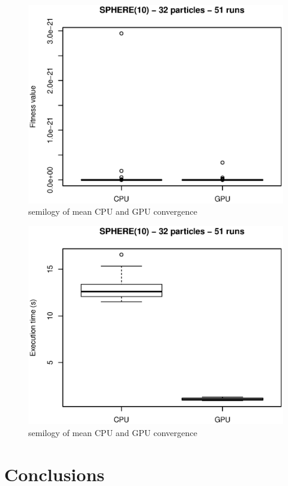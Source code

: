 \documentclass{article}
\begin{document}
	\begin{figure}[!htb]
		\centering
		\includegraphics[width=.8\textwidth]{../img/sphere10_32particles_multi_runs_fitness.eps}
		\caption{semilogy of mean CPU and GPU convergence}
		\label{fig:semilogy_convergence}
	\end{figure}


	\begin{figure}[!htb]
		\centering
		\includegraphics[width=.8\textwidth]{../img/sphere10_32particles_multi_runs_time.eps}
		\caption{semilogy of mean CPU and GPU convergence}
		\label{fig:semilogy_convergence}
	\end{figure}

	

	\section{Conclusions}

	
	 
\end{document}
